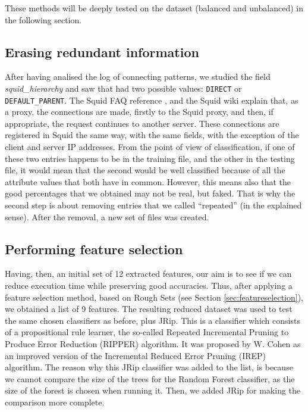 \documentclass{llncs}
\begin{document}
These methods will be deeply tested on the dataset (balanced and unbalanced) in the following section.

%
\subsection{Erasing redundant information}
\label{subsec:duplicateddata}

After having analised the log of connecting patterns, we studied the field \textit{squid\_hierarchy} and saw that had two possible values: \texttt{DIRECT} or \texttt{DEFAULT\_PARENT}. The Squid FAQ reference \cite{squid_logs}, and the Squid wiki \cite{squid_wiki} explain that, as a proxy, the connections are made, firstly to the Squid proxy, and then, if appropriate, the request continues to another server. These connections are registered in Squid the same way, with the same fields, with the exception of the client and server IP addresses. From the point of view of classification, if one of these two entries happens to be in the training file, and the other in the testing file, it would mean that the second would be well classified because of all the attribute values that both have in common. However, this means also that the good percentages that we obtained may not be real, but faked. That is why the second step is about removing entries that we called ``repeated'' (in the explained sense). After the removal, a new set of files was created.

%
\subsection{Performing feature selection}
\label{subsec:featselresults}

Having, then, an initial set of 12 extracted features, our aim is to see if we can reduce execution time while preserving good accuracies. Thus, after applying a feature selection method, based on Rough Sets (see Section \ref{sec:featureselection}), we obtained a list of 9 features. 
The resulting reduced dataset was used to test the same chosen classifiers as before, plus JRip. This is a classifier which consists of a propositional rule learner, the so-called Repeated Incremental Pruning to Produce Error Reduction (RIPPER) algorithm. It was proposed by W. Cohen \cite{cohen1995fast} as an improved version of the Incremental Reduced Error Pruning (IREP) algorithm. The reason why this JRip classifier was added to the list, is because we cannot compare the size of the trees for the Random Forest classifier, as the size of the forest is chosen when running it. Then, we added JRip for making the comparison more complete.
\end{document}
